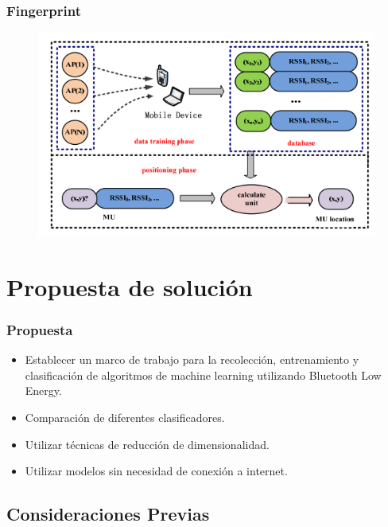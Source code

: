 \documentclass[handout]{beamer}
\begin{document}
\begin{frame}
\frametitle{Fingerprint}

\begin{figure}
\includegraphics[width=.8\linewidth]{../figures/finger.png}
\end{figure}

\end{frame}


\section{Propuesta de solución}

\begin{frame}
\frametitle{Propuesta}

\begin{itemize}
\item Establecer un marco de trabajo para la recolección, entrenamiento y clasificación de algoritmos de machine learning utilizando Bluetooth Low Energy.\\

\pause

\item Comparación de diferentes clasificadores.\\

\pause
\item Utilizar técnicas de reducción de dimensionalidad.\\
\pause

\item Utilizar modelos sin necesidad de conexión a internet.
\end{itemize}

\end{frame}


\subsection{Consideraciones Previas}
\end{document}
